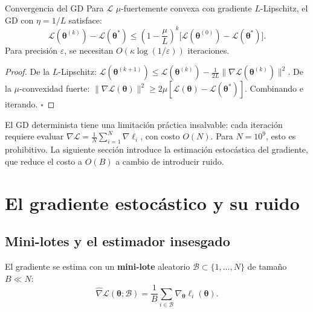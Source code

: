 \begin{proposicion}{Convergencia del GD}
\label{prop:conv_gd}
Para $\mathcal{L}$ $\mu$-fuertemente convexa con gradiente $L$-Lipschitz,
el GD con $\eta = 1/L$ satisface:
\begin{equation}
  \mathcal{L}(\bm{\theta}^{(k)}) - \mathcal{L}(\bm{\theta}^*)
  \leq \left(1-\frac{\mu}{L}\right)^k
  \bigl[\mathcal{L}(\bm{\theta}^{(0)})-\mathcal{L}(\bm{\theta}^*)\bigr].
  \label{eq:conv_gd}
\end{equation}
Para precisión $\varepsilon$, se necesitan $O(\kappa\log(1/\varepsilon))$
iteraciones.
\end{proposicion}

\begin{proof}
De la $L$-Lipschitz:
$\mathcal{L}(\bm{\theta}^{(k+1)}) \leq \mathcal{L}(\bm{\theta}^{(k)})
- \frac{1}{2L}\|\nabla\mathcal{L}(\bm{\theta}^{(k)})\|^2$.
De la $\mu$-convexidad fuerte:
$\|\nabla\mathcal{L}(\bm{\theta})\|^2 \geq
2\mu[\mathcal{L}(\bm{\theta})-\mathcal{L}(\bm{\theta}^*)]$.
Combinando e iterando. $\square$
\end{proof}

El GD determinista tiene una limitación práctica insalvable: cada iteración
requiere evaluar $\nabla\mathcal{L} = \frac{1}{N}\sum_{i=1}^N\nabla\ell_i$,
con costo $O(N)$. Para $N = 10^9$, esto es prohibitivo. La siguiente
sección introduce la estimación estocástica del gradiente, que reduce el
costo a $O(B)$ a cambio de introducir ruido.

\section{El gradiente estocástico y su ruido}
\label{sec:sgd_ruido}


\subsection{Mini-lotes y el estimador insesgado}
\label{subsec:minibatch}

El gradiente se estima con un \textbf{mini-lote} aleatorio
$\mathcal{B} \subset \{1,\ldots,N\}$ de tamaño $B \ll N$:
\begin{equation}
  \hat{\nabla}\mathcal{L}(\bm{\theta};\mathcal{B})
  = \frac{1}{B}\sum_{i\in\mathcal{B}}
  \nabla_{\bm{\theta}}\ell_i(\bm{\theta}).
  \label{eq:grad_minibatch}
\end{equation}


